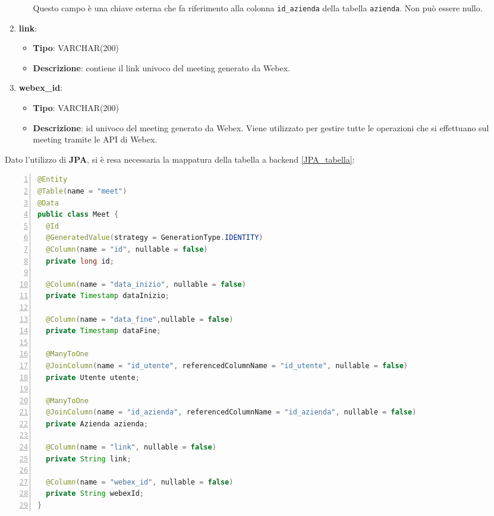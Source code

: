 \begin{enumerate}
\begin{itemize}
            Questo campo è una chiave esterna che fa riferimento alla colonna \texttt{id_azienda} della tabella \texttt{azienda}. 
            Non può essere nullo.
        \end{itemize}
    \item \textbf{link}:
        \begin{itemize}
            \item \textbf{Tipo}: VARCHAR(200)
            \item \textbf{Descrizione}: contiene il link univoco del meeting generato da Webex.
        \end{itemize}
    \item \textbf{webex_id}:
        \begin{itemize}
            \item \textbf{Tipo}: VARCHAR(200)
            \item \textbf{Descrizione}: id univoco del meeting generato da Webex.
            Viene utilizzato per gestire tutte le operazioni che si effettuano sul meeting tramite le API di Webex.
        \end{itemize}
\end{enumerate}
\vspace{20pt}
Dato l'utilizzo di \textbf{JPA}, si è resa necessaria la mappatura della tabella a backend \ref{JPA_tabella}:
\begin{lstlisting}[language=java, frame=lines, basicstyle=\ttfamily\scriptsize, numbers=left, 
    label={JPA_tabella}, caption={mappatura della tabella a backend}]
@Entity
@Table(name = "meet")
@Data
public class Meet {
  @Id
  @GeneratedValue(strategy = GenerationType.IDENTITY)
  @Column(name = "id", nullable = false)
  private long id;
	
  @Column(name = "data_inizio", nullable = false)
  private Timestamp dataInizio;
	
  @Column(name = "data_fine",nullable = false)
  private Timestamp dataFine;
	
  @ManyToOne
  @JoinColumn(name = "id_utente", referencedColumnName = "id_utente", nullable = false)
  private Utente utente;
	
  @ManyToOne
  @JoinColumn(name = "id_azienda", referencedColumnName = "id_azienda", nullable = false)
  private Azienda azienda;
	
  @Column(name = "link", nullable = false)
  private String link;
	
  @Column(name = "webex_id", nullable = false)
  private String webexId;
}
\end{lstlisting}

